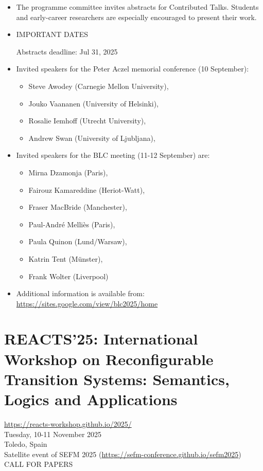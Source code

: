 \documentclass[prodmode,acmtecs]{acmsmall} %
\begin{document}
{\begin{itemize}
\item  The programme committee invites abstracts for Contributed Talks. Students and early-career researchers are especially encouraged to present their work.  
 
\item  IMPORTANT DATES 
 
Abstracts deadline: Jul 31, 2025 
 
\item  Invited speakers for the Peter Aczel memorial conference (10 September): 
 
\begin{itemize}\item  Steve Awodey (Carnegie Mellon University),
\item  Jouko Vaananen (University of Helsinki),
\item  Rosalie Iemhoff (Utrecht University),
\item  Andrew Swan (University of Ljubljana),
\end{itemize} 
\item  Invited speakers for the BLC meeting (11-12 September) are: 
 
\begin{itemize}\item  Mirna Dzamonja (Paris),
\item  Fairouz Kamareddine (Heriot-Watt),
\item  Fraser MacBride (Manchester),
\item  Paul-André Melliès (Paris),
\item  Paula Quinon (Lund/Warsaw),
\item  Katrin Tent (Münster),
\item  Frank Wolter (Liverpool)
\end{itemize} 
\item  Additional information is available from: \href{https://sites.google.com/view/blc2025/home}{https://sites.google.com/view/blc2025/home} 
 
\end{itemize}\section{REACTS'25: International Workshop on Reconfigurable Transition Systems: Semantics, Logics and Applications}\label{REACTS25}  \href{https://reacts-workshop.github.io/2025/}{https://reacts-workshop.github.io/2025/}\\ 
  Tuesday, 10-11 November 2025\\ 
  Toledo, Spain\\ 
  Satellite event of SEFM 2025 (\href{https://sefm-conference.github.io/sefm2025}{https://sefm-conference.github.io/sefm2025})\\ 
CALL FOR PAPERS 

}
\end{document}

